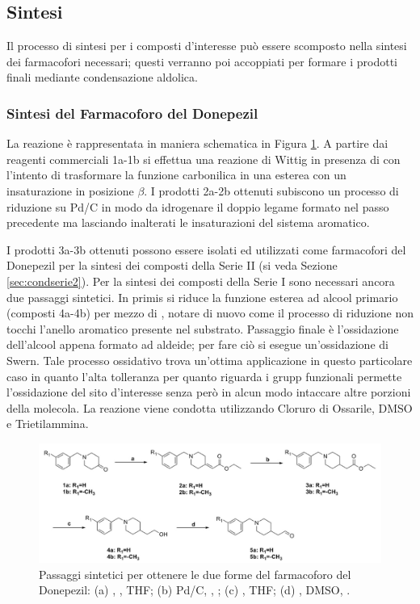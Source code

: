 \documentclass[a4paper, 12pt]{article}
\begin{document}
\subsection{Sintesi}
Il processo di sintesi per i composti d'interesse può essere scomposto nella sintesi dei farmacofori necessari; questi verranno poi accoppiati per formare i prodotti finali mediante condensazione aldolica.

\subsubsection{Sintesi del Farmacoforo del Donepezil}
\label{sec:sintesidone}
La reazione è rappresentata in maniera schematica in Figura \ref{fig:farmadone_curcdone}. A partire dai reagenti commerciali 1a-1b si effettua una reazione di Wittig in presenza di  con l'intento di trasformare la funzione carbonilica in una esterea con un insaturazione in posizione $\beta$. I prodotti 2a-2b ottenuti subiscono un processo di riduzione su Pd/C in modo da idrogenare il doppio legame formato nel passo precedente ma lasciando inalterati le insaturazioni del sistema aromatico.

I prodotti 3a-3b ottenuti possono essere isolati ed utilizzati come farmacofori del Donepezil per la sintesi dei composti della Serie II (si veda Sezione \ref{sec:condserie2}). Per la sintesi dei composti della Serie I sono necessari ancora due passaggi sintetici. In primis si riduce la funzione esterea ad alcool primario (composti 4a-4b) per mezzo di , notare di nuovo come il processo di riduzione non tocchi l'anello aromatico presente nel substrato. Passaggio finale è l'ossidazione dell'alcool appena formato ad aldeide; per fare ciò si esegue un'ossidazione di Swern. Tale processo ossidativo trova un'ottima applicazione in questo particolare caso in quanto l'alta tolleranza per quanto riguarda i grupp funzionali permette l'ossidazione del sito d'interesse senza però in alcun modo intaccare altre porzioni della molecola. La reazione viene condotta utilizzando Cloruro di Ossarile, DMSO e Trietilammina. \cite{bruice_chimica_2012}

\begin{figure}[H]
	\centering
	\includegraphics[width=\linewidth]{immagini/farmadone_curcdone.png}
	\caption{Passaggi sintetici per ottenere le due forme del farmacoforo del Donepezil: (a) ,  , THF; (b) Pd/C,  , ; (c)  , THF; (d) , DMSO, .}
	\label{fig:farmadone_curcdone}
\end{figure}
\end{document}
